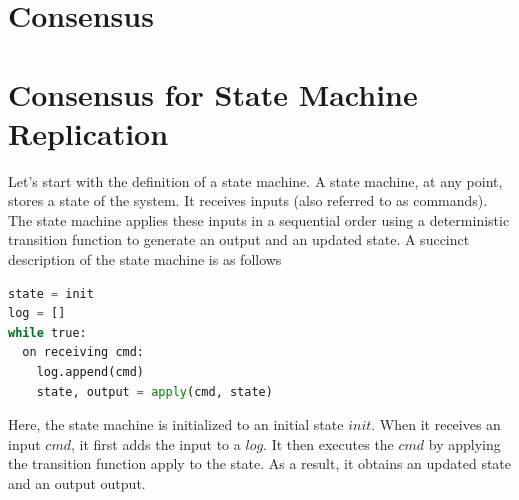
\section{Consensus}
\section{Consensus for State Machine Replication}

Let's start with the definition of a state machine.
A state machine, at any point, stores a state of the system.
It receives inputs (also referred to as commands). 
The state machine applies these inputs in a sequential order using a deterministic
transition function to generate an output and an updated state.
A succinct description of the state machine is as follows

\label{smrdef}
  \begin{lstlisting}[language=Python,
    caption={basic SMR}
  ]
state = init
log = []
while true:
  on receiving cmd:
    log.append(cmd)
    state, output = apply(cmd, state)
\end{lstlisting}

Here, the state machine is initialized to an initial state $init$.
When it receives an input $cmd$, it first adds the input to a $log$. 
It then executes the $cmd$ by applying the transition function apply to the state. As a result, it obtains an updated state and an output output.

